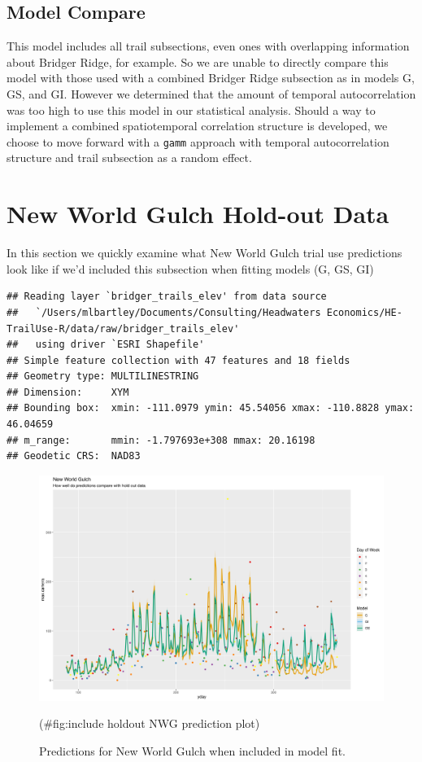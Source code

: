 \documentclass[
]{book}
\begin{document}
\hypertarget{model-compare}{%
\section{Model Compare}\label{model-compare}}

This model includes all trail subsections, even ones with overlapping information about Bridger Ridge, for example. So we are unable to directly compare this model with those used with a combined Bridger Ridge subsection as in models G, GS, and GI. However we determined that the amount of temporal autocorrelation was too high to use this model in our statistical analysis. Should a way to implement a combined spatiotemporal correlation structure is developed, we choose to move forward with a \texttt{gamm} approach with temporal autocorrelation structure and trail subsection as a random effect.

\hypertarget{new-world-gulch-hold-out-data}{%
\chapter{New World Gulch Hold-out Data}\label{new-world-gulch-hold-out-data}}

In this section we quickly examine what New World Gulch trial use predictions look like if we'd included this subsection when fitting models (G, GS, GI)

\begin{verbatim}
## Reading layer `bridger_trails_elev' from data source 
##   `/Users/mlbartley/Documents/Consulting/Headwaters Economics/HE-TrailUse-R/data/raw/bridger_trails_elev' 
##   using driver `ESRI Shapefile'
## Simple feature collection with 47 features and 18 fields
## Geometry type: MULTILINESTRING
## Dimension:     XYM
## Bounding box:  xmin: -111.0979 ymin: 45.54056 xmax: -110.8828 ymax: 46.04659
## m_range:       mmin: -1.797693e+308 mmax: 20.16198
## Geodetic CRS:  NAD83
\end{verbatim}

\begin{figure}

{\centering \includegraphics[width=1\linewidth]{../figures/NWG_insample_pred_compare} 

}

\caption{Predictions for New World Gulch when included in model fit.}(\#fig:include holdout NWG prediction plot)
\end{figure}
\end{document}
